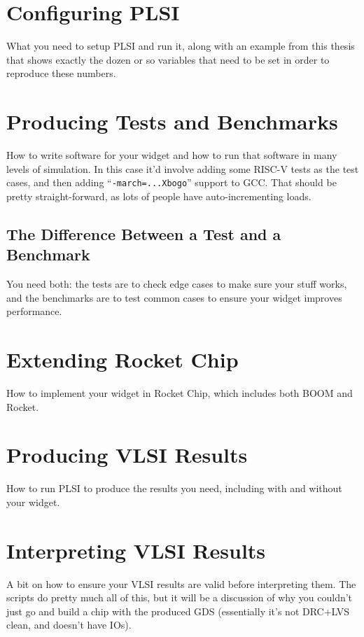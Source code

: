 \documentclass{article}
\begin{document}
\section{Configuring PLSI}

What you need to setup PLSI and run it, along with an example from this thesis
that shows exactly the dozen or so variables that need to be set in order to
reproduce these numbers.

\section{Producing Tests and Benchmarks}

How to write software for your widget and how to run that software in many
levels of simulation.  In this case it'd involve adding some RISC-V tests as
the test cases, and then adding ``\texttt{-march=...Xbogo}'' support to GCC.
That should be pretty straight-forward, as lots of people have
auto-incrementing loads.

\subsection{The Difference Between a Test and a Benchmark}

You need both: the tests are to check edge cases to make sure your stuff works,
and the benchmarks are to test common cases to ensure your widget improves
performance.

\section{Extending Rocket Chip}

How to implement your widget in Rocket Chip, which includes both BOOM and
Rocket.

\section{Producing VLSI Results}

How to run PLSI to produce the results you need, including with and without
your widget.

\section{Interpreting VLSI Results}

A bit on how to ensure your VLSI results are valid before interpreting them.
The scripts do pretty much all of this, but it will be a discussion of why you
couldn't just go and build a chip with the produced GDS (essentially it's not
DRC+LVS clean, and doesn't have IOs).
\end{document}

